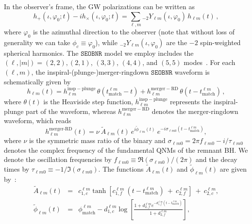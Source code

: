 \documentclass[twocolumn,prd,aps,superscriptaddress,preprintnumbers,tightenlines,showpacs,nofootinbib,eqsecnum,amsfonts,amsmath]{revtex4-1}
\newcommand{\SEOB}{\texttt{SEOBNR}}
\begin{document}
In the observer's frame, the GW polarizations can be written as
%
\begin{equation}
h_+(\iota,\varphi_0;t ) - i h_\times(\iota,\varphi_0;t) = \sum_{\ell, m} {}_{-\!2}Y_{\ell m}(\iota,\varphi_0)\, h_{\ell m}(t)\,,
\end{equation}
%
where $\varphi_0$ is the azimuthal direction to the observer (note that without loss of generality we can take $\phi_c\equiv\varphi_0$), while ${}_{-\!2}Y_{\ell m}(\iota,\varphi_0)$ are the $-2$ spin-weighted spherical harmonics. The $\SEOB$ model we employ includes the $(\ell, |m|)=(2,2),(2,1)$, $(3,3)$, $(4,4)$, and $(5,5)$ modes~\cite{Cotesta:2018fcv}. For each $(\ell, m)$, the inspiral-(plunge-)merger-ringdown $\SEOB$ waveform is schematically given by
%
\begin{equation}
h_{\ell m}(t) = h_{\ell m}^\mathrm{insp-plunge}\, \theta(t_\mathrm{match}^{\ell m} - t) + h_{\ell m}^\mathrm{merger-RD}\,\theta(t-t_\mathrm{match}^{\ell m})\,,
\end{equation}
where $\theta(t)$ is the Heaviside step function, $h_{\ell m}^\mathrm{insp-plunge}$ represents the inspiral-plunge part of the waveform, whereas $h_{\ell m}^\mathrm{merger-RD}$ denotes the merger-ringdown waveform, which reads~\citep{Bohe:2016gbl,Cotesta:2018fcv}
%
\begin{equation}
\label{RD}
h_{\ell m}^{\textrm{merger-RD}}(t) = \nu \ \tilde{A}_{\ell m}(t)\ e^{i \tilde{\phi}_{\ell m}(t)} \ e^{-i \sigma_{\ell m 0}(t-t_{\textrm{match}}^{\ell m})},
\end{equation}
%
where $\nu$ is the symmetric mass ratio of the binary and $\sigma_{\ell m0} = 2\pi f_{\ell m 0} -i/\tau_{\ell m 0}$ denotes the complex frequency of the fundamental QNMs of the remnant BH. We denote the oscillation frequencies by $f_{\ell m  0}\equiv \Re(\sigma_{\ell m0})/(2\pi)$ and the decay times by $\tau_{\ell m 0}\equiv -1/\Im(\sigma_{\ell m0}) $.
The functions $\tilde{A}_{\ell m}(t)$ and $\tilde{\phi}_{\ell m}(t)$ are given by~\cite{Bohe:2016gbl,Cotesta:2018fcv}:
%
\begin{subequations}
\begin{eqnarray}
\label{eq:ansatz_amp}
\tilde{A}_{\ell m}(t) &=& c_{1,c}^{\ell m} \tanh[c_{1,f}^{\ell m}\ (t-t_{\textrm{match}}^{\ell m}) \ +\ c_{2,f}^{\ell m}] \ + \ c_{2,c}^{\ell m},\\
\label{eq:ansatz_phase}
\tilde{\phi}_{\ell m}(t) &=& \phi_{\textrm{match}}^{\ell m} - d_{1,c}^{\ell m} \log\left[\frac{1+d_{2,f}^{\ell m} e^{-d_{1,f}^{\ell m}(t-t_{\textrm{match}}^{\ell m})}}{1+d_{2,f}^{\ell m}}\right],
\end{eqnarray}
\end{subequations}
\end{document}
